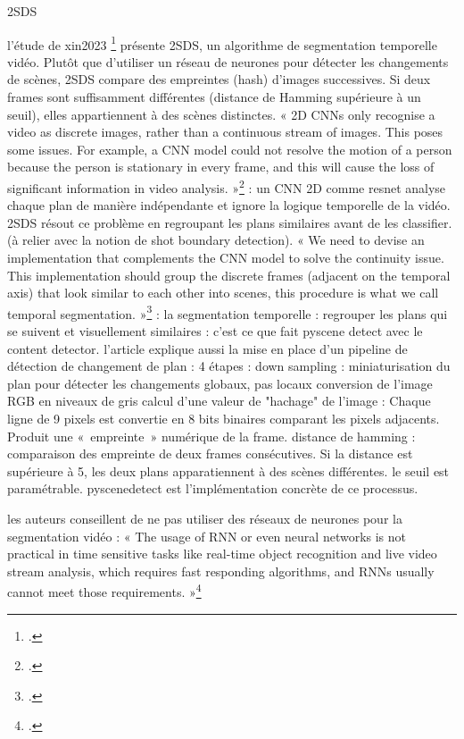 \begin{itemize}
\subitem 2SDS

l'étude de xin2023 \footcite{xin2023} présente 2SDS, un algorithme de segmentation temporelle vidéo. Plutôt que d’utiliser un réseau de neurones pour détecter les changements de scènes, 2SDS compare des empreintes (hash) d’images successives. Si deux frames sont suffisamment différentes (distance de Hamming supérieure à un seuil), elles appartiennent à des scènes distinctes.
« 2D CNNs only recognise a video as discrete images, rather than a continuous stream of images. This poses some issues. For example, a CNN model could not resolve the motion of a person because the person is stationary in every frame, and this will cause the loss of significant information in video analysis. »\footcite{xin2023} : un CNN 2D comme resnet analyse chaque plan de manière indépendante et ignore la logique temporelle de la vidéo. 2SDS résout ce problème en regroupant les plans similaires avant de les classifier. (à relier avec la notion de shot boundary detection). 
« We need to devise an implementation that complements the CNN model to solve the continuity issue. This implementation should group the discrete frames (adjacent on the temporal axis) that look similar to each other into scenes, this procedure is what we call temporal segmentation. »\footcite{xin2023} : la segmentation temporelle : regrouper les plans qui se suivent et visuellement similaires : c'est ce que fait pyscene detect avec le content detector. 
l'article explique aussi la mise en place d'un pipeline de détection de changement de plan : 
4 étapes : 
\subitem down sampling : miniaturisation du plan pour détecter les changements globaux, pas locaux
\subitem conversion de l'image RGB en niveaux de gris 
\subitem calcul d'une valeur de "hachage" de l'image : Chaque ligne de 9 pixels est convertie en 8 bits binaires comparant les pixels adjacents. Produit une « empreinte » numérique de la frame.
\subitem distance de hamming : 
comparaison des empreinte de deux frames consécutives. Si la distance est supérieure à 5, les deux plans apparatiennent à des scènes différentes. le seuil est paramétrable. pyscenedetect est l'implémentation concrète de ce processus. 

les auteurs conseillent de ne pas utiliser des réseaux de neurones pour la segmentation vidéo : « The usage of RNN or even neural networks is not practical in time sensitive tasks like real-time object recognition and live video stream analysis, which requires fast responding algorithms, and RNNs usually cannot meet those requirements. »\footcite{xin2023}


\end{itemize}
